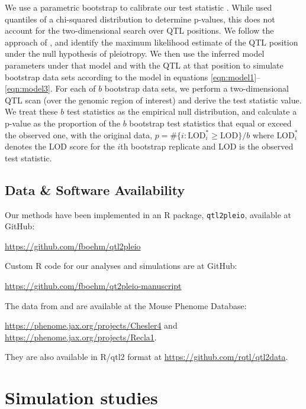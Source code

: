 \documentclass[oneside]{book}\usepackage[]{graphicx}\usepackage[]{color}
\begin{document}
We use a parametric bootstrap to calibrate our test statistic
\citep{efron1979}. While \citet{jiang1995multiple} used quantiles of a
chi-squared distribution to determine p-values, this does not account
for the two-dimensional search over QTL positions.
We follow the approach of \citet{tian2016dissection}, and identify
the maximum likelihood estimate of the QTL position under the null
hypothesis of pleiotropy.
We then use the inferred model parameters under that model and with
the QTL at that position to simulate bootstrap data sets according to
the model in equations \ref{eqn:model1}--\ref{eqn:model3}.
For each of $b$ bootstrap data sets, we
perform a two-dimensional QTL scan (over the genomic region of
interest) and derive the test
statistic value. We treat these $b$ test statistics as the
empirical null distribution, and calculate a p-value as the
proportion of the $b$ bootstrap test statistics that equal or exceed
the observed one, with the original data,
$p = \# \{ i:\text{LOD}^*_i \geq \text{LOD}\} / b$
where $\text{LOD}_i^*$ denotes the LOD score for the $i$th bootstrap
replicate and LOD is the observed test statistic.



\subsection{Data \& Software Availability}

Our methods have been implemented in an R package, \texttt{qtl2pleio},
available at GitHub:

\href{https://github.com/fboehm/qtl2pleio}{https://github.com/fboehm/qtl2pleio}

\noindent Custom R code for our analyses and simulations are at GitHub:

\href{https://github.com/fboehm/qtl2pleio-manuscript}{https://github.com/fboehm/qt2pleio-manuscript}

\noindent The data from \citet{recla2014precise} and
\citet{logan2013high} are available at the Mouse Phenome Database:

\href{https://phenome.jax.org/projects/Chesler4}{https://phenome.jax.org/projects/Chesler4} and \href{https://phenome.jax.org/projects/Recla1}{https://phenome.jax.org/projects/Recla1}.

\noindent They are also available in R/qtl2 format at
\href{https://github.com/rqtl/qtl2data}{https://github.com/rqtl/qtl2data}.




\section{Simulation studies}
\end{document}
